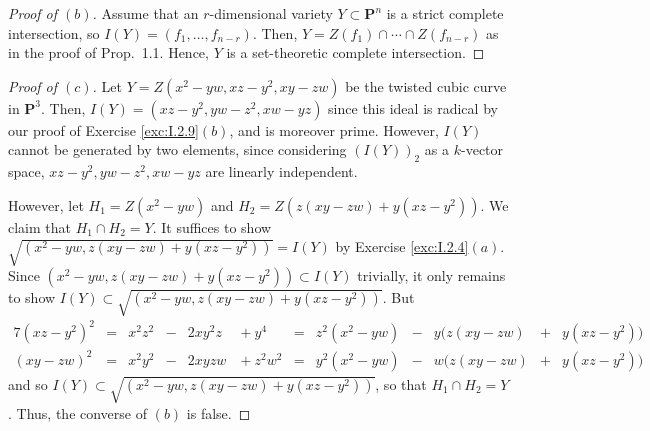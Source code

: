 \documentclass[10pt]{article}
\theoremstyle{definition}
\theoremstyle{remark}
\numberwithin{equation}{section}
\numberwithin{figure}{subsubsection}
\newcommand{\PP}{\mathbf{P}}
\begin{document}
\begin{proof}[Proof of $(b)$]
  Assume that an $r$-dimensional variety $Y \subset \PP^n$ is a strict complete
  intersection, so $I(Y) = (f_1, \ldots, f_{n-r})$.
  Then, $Y = Z(f_1) \cap \cdots \cap Z(f_{n-r})$ as in the proof of
  Prop.~1.1. Hence, $Y$ is a set-theoretic complete intersection. 
\end{proof}
\begin{proof}[Proof of $(c)$]
  Let $Y = Z(x^2-yw,xz-y^2,xy-zw)$ be the twisted cubic curve in $\PP^3$. Then,
  $I(Y) = (xz-y^2, yw-z^2, xw-yz)$ since this ideal is radical by our proof of
  Exercise \ref{exc:I.2.9}$(b)$, and is moreover prime. However, $I(Y)$ cannot be
  generated by two elements, since considering $(I(Y))_2$ as a $k$-vector space,
  $xz-y^2, yw-z^2, xw-yz$ are linearly independent.
  \par However, let $H_1 = Z(x^2-yw)$ and $H_2 = Z(z(xy-zw)+y(xz-y^2))$. We
  claim that $H_1 \cap H_2 = Y$. It suffices to show
  $\sqrt{(x^2-yw,z(xy-zw)+y(xz-y^2))} = I(Y)$ by Exercise \ref{exc:I.2.4}$(a)$.
  Since $(x^2-yw,z(xy-zw)+y(xz-y^2)) \subset I(Y)$ trivially, it only remains to
  show $I(Y) \subset \sqrt{(x^2-yw,z(xy-zw)+y(xz-y^2))}$. But
  \begin{alignat*}{7}
    (xz-y^2)^2 &={}& x^2z^2 &-{}& 2xy^2z &{}+ y^4 &{}={}& z^2(x^2-yw) &{}-{}&
    y(z(xy-zw)&{}+{}&y(xz-y^2))\\
    (xy-zw)^2 &={}& x^2y^2 &-{}& 2xyzw &{}+ z^2w^2 &{}={}& y^2(x^2-yw) &{}-{}&
    w(z(xy-zw)&{}+{}&y(xz-y^2))
  \end{alignat*}
  and so $I(Y) \subset \sqrt{(x^2-yw,z(xy-zw)+y(xz-y^2))}$, so that
  $H_1 \cap H_2 = Y$. Thus, the converse of $(b)$ is false.
\end{proof}
\end{document}
